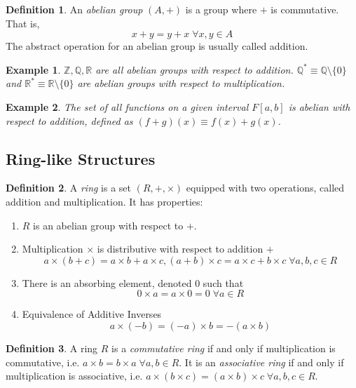\documentclass{article}
\newtheorem{example}{Example}[section]
\theoremstyle{remark}
\theoremstyle{definition}
\newtheorem{definition}{Definition}[section]
\begin{document}
\begin{definition}
An \textit{abelian group} $(A, +)$ is a group where $+$ is commutative. That is, 
\[x+y = y+x \; \forall x, y \in A \]
The abstract operation for an abelian group is usually called addition. 
\end{definition}

\begin{example}
$\mathbb{Z}, \mathbb{Q}, \mathbb{R}$ are all abelian groups with respect to addition. $\mathbb{Q}^{*} \equiv \mathbb{Q} \setminus \{0\}$ and $\mathbb{R}^{*} \equiv \mathbb{R} \setminus \{0\}$ are abelian groups with respect to multiplication.
\end{example}

\begin{example}
The set of all functions on a given interval $F[a,b]$ is abelian with respect to addition, defined as $(f+g)(x) \equiv f(x) + g(x)$. 
\end{example}

\subsection{Ring-like Structures}

\begin{definition}
A \textit{ring} is a set $(R, +, \times)$ equipped with two operations, called addition and multiplication. It has properties: 
\begin{enumerate}
    \item $R$ is an abelian group with respect to $+$.
    \item Multiplication $\times$ is distributive with respect to addition $+$
\[a \times (b + c) = a\times b + a\times c, (a+b)\times c = a\times c + b\times c \; \forall a, b, c \in R\]
    \item There is an absorbing element, denoted $0$ such that 
\[ 0\times a = a\times 0 = 0 \; \forall a \in R \]
    \item Equivalence of Additive Inverses
\[ a \times (-b) = (-a) \times b = - (a\times b) \]
\end{enumerate}
\end{definition}

\begin{definition}
A ring $R$ is a \textit{commutative ring} if and only if multiplication is commutative, i.e. $a\times b = b \times a \; \forall a, b \in R$. It is an \textit{associative ring} if and only if multiplication is associative, i.e. $a \times (b \times c) = (a \times b) \times c \; \forall a, b, c \in R$.
\end{definition}
\end{document}

